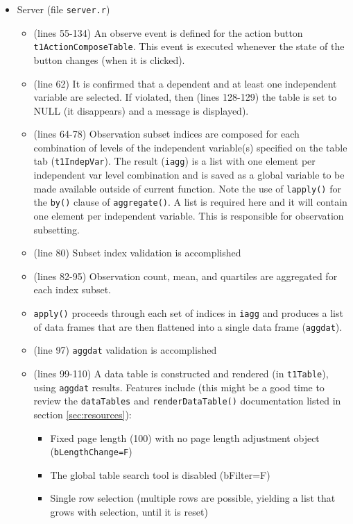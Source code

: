 \documentclass[10pt, letterpaper]{article}
\begin{document}
\begin{spacing}{1.0}
\begin{itemize}
    \item Server (file \texttt{server.r})
      \begin{itemize}
        \item (lines 55-134) An observe event is defined for the action button \texttt{t1ActionComposeTable}.  This event is executed whenever the state of the button changes (when it is clicked).
        \item (line 62) It is confirmed that a dependent and at least one independent variable are selected.  If violated, then (lines 128-129) the table is set to NULL (it disappears) and a message is displayed).
        \item (lines 64-78) Observation subset indices are composed for each combination of levels of the independent variable(s) specified on the table tab (\texttt{t1IndepVar}).  The result (\texttt{iagg}) is a list with one element per independent var level combination and is saved as a global variable to be made available outside of current function.  Note the use of \texttt{lapply()} for the \texttt{by()} clause of \texttt{aggregate()}.  A list is required here and it will contain one element per independent variable.  This is responsible for observation subsetting.
        \item (line 80) Subset index validation is accomplished
        \item (lines 82-95) Observation count, mean, and quartiles are aggregated for each index subset.  \item \texttt{apply()} proceeds through each set of indices in \texttt{iagg} and produces a list of data frames that are then flattened into a single data frame (\texttt{aggdat}).
        \item (line 97) \texttt{aggdat} validation is accomplished
        \item (lines 99-110) A data table is constructed and rendered (in \texttt{t1Table}), using \texttt{aggdat} results.  Features include (this might be a good time to review the \texttt{dataTables} and \texttt{renderDataTable()} documentation listed in section \ref{sec:resources}):
          \begin{itemize}
              \item Fixed page length (100) with no page length adjustment object (\texttt{bLengthChange=F})
              \item The global table search tool is disabled (bFilter=F)
              \item Single row selection (multiple rows are possible, yielding a list that grows with selection, until it is reset)

\end{itemize}
\end{itemize}
\end{itemize}
\end{spacing}
\end{document}
